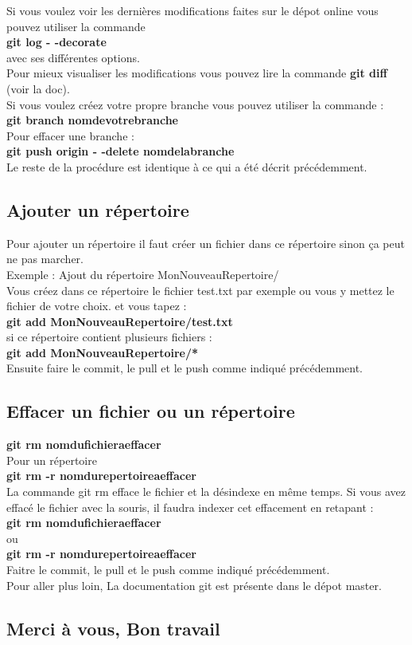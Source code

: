 \documentclass[a4paper, 12pt, openany]{report}
\begin{document}
Si vous voulez voir les dernières modifications faites sur le dépot online vous pouvez utiliser la commande \\
 \textbf{git log - -decorate} \\
avec ses différentes options. \\ 
Pour mieux visualiser les modifications vous pouvez lire la commande  \textbf{git diff} (voir la doc). \\
Si vous voulez créez votre propre branche vous pouvez utiliser la commande : \\
 \textbf{git branch nomdevotrebranche}\\
 Pour effacer une branche : \\
 \textbf{git push origin - -delete nomdelabranche}\\
 Le reste de la procédure est identique à ce qui a été décrit précédemment. 
 
 \subsection*{Ajouter un répertoire}
 Pour ajouter un répertoire il faut créer un fichier dans ce répertoire sinon ça peut ne pas marcher. \\
 Exemple : Ajout du répertoire MonNouveauRepertoire/ \\
 Vous créez dans ce répertoire le fichier test.txt par exemple ou vous y mettez le fichier de votre choix. 
 et vous tapez : \\
 \textbf{ git add MonNouveauRepertoire/test.txt } \\
 si ce répertoire contient plusieurs fichiers :\\
  \textbf{git add MonNouveauRepertoire/*}\\
  Ensuite faire le commit, le pull et le push comme indiqué précédemment. 
 
 \subsection*{Effacer un fichier ou un répertoire}
\textbf{git rm nomdufichieraeffacer}\\
 Pour un répertoire \\
\textbf{git rm -r nomdurepertoireaeffacer}\\
La commande git rm efface le fichier  et la désindexe en même temps. 
Si vous avez effacé le fichier avec la souris,  il faudra indexer cet effacement en retapant : \\
\textbf{git rm nomdufichieraeffacer} \\
ou\\
\textbf{git rm -r nomdurepertoireaeffacer} \\
Faitre le commit, le pull et le push comme indiqué précédemment.\\

Pour aller plus loin,  La documentation git est présente dans le dépot master.\\
\vspace{3cm}
\subsection*{Merci à vous, Bon travail }
\end{document}
